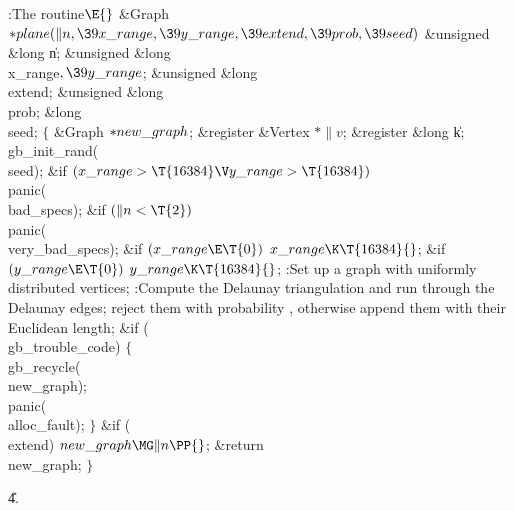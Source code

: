 \B{}:The  routine\X${}\E{}$\6
\1\1\&{Graph} ${}{*}\\{plane}(\|n,\39\\{x\_range},\39\\{y\_range},\39%
\\{extend},\39\\{prob},\39\\{seed}){}$\6
\&{unsigned} \&{long} \|n;\6
\&{unsigned} \&{long} \\{x\_range}${},\39\\{y\_range}{}$;\6
\&{unsigned} \&{long} \\{extend};\6
\&{unsigned} \&{long} \\{prob};\6
\&{long} \\{seed};\2\2\6
${}\{{}$\5
\1\&{Graph} ${}{*}\\{new\_graph}{}$;\6
\&{register} \&{Vertex} ${}{*}\|v{}$;\6
\&{register} \&{long} \|k;\7
\\{gb\_init\_rand}(\\{seed});\6
\&{if} ${}(\\{x\_range}>\T{16384}\V\\{y\_range}>\T{16384}){}$\1\5
\\{panic}(\\{bad\_specs});\2\6
\&{if} ${}(\|n<\T{2}){}$\1\5
\\{panic}(\\{very\_bad\_specs});\2\6
\&{if} ${}(\\{x\_range}\E\T{0}){}$\1\5
${}\\{x\_range}\K\T{16384}{}$;\2\6
\&{if} ${}(\\{y\_range}\E\T{0}){}$\1\5
${}\\{y\_range}\K\T{16384}{}$;\2\6
:Set up a graph with  uniformly distributed vertices\X;\6
:Compute the Delaunay triangulation and run through the Delaunay edges;
reject them with probability , otherwise append them
with their Euclidean length\X;\6
\&{if} (\\{gb\_trouble\_code})\5
${}\{{}$\1\6
\\{gb\_recycle}(\\{new\_graph});\6
\\{panic}(\\{alloc\_fault});\6
\4${}\}{}$\2\6
\&{if} (\\{extend})\1\5
${}\\{new\_graph}\MG\|n\PP{}$;\2\6
\&{return} \\{new\_graph};\6
\4${}\}{}$\2\par
\U4.\fi

